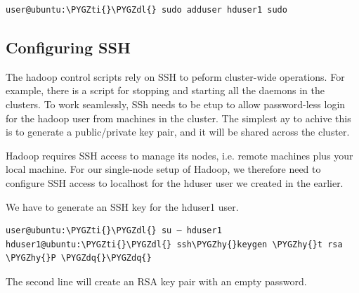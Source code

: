 \documentclass[a4paper,12pt,oneside]{sphinxmanual}
\def\PYGZdl{\char`\$}
\def\PYGZhy{\char`\-}
\def\PYGZdq{\char`\"}
\def\PYGZti{\char`\~}
\begin{document}
\begin{Verbatim}[commandchars=\\\{\}]
user@ubuntu:\PYGZti{}\PYGZdl{} sudo adduser hduser1 sudo
\end{Verbatim}


\subsection{Configuring SSH}
\label{document:configuring-ssh}
The hadoop control scripts rely on SSH to peform cluster-wide operations. For example, there is a script for stopping and starting all the daemons in the clusters. To work seamlessly, SSh needs to be etup to allow password-less login for the hadoop user from machines in the cluster. The simplest ay to achive this is to generate a public/private key pair, and it will be shared across the cluster.

Hadoop requires SSH access to manage its nodes, i.e. remote machines plus your local machine. For our single-node setup of Hadoop, we therefore need to configure SSH access to localhost for the hduser user we created in the earlier.

We have to generate an SSH key for the hduser1 user.

\begin{Verbatim}[commandchars=\\\{\}]
user@ubuntu:\PYGZti{}\PYGZdl{} su – hduser1
hduser1@ubuntu:\PYGZti{}\PYGZdl{} ssh\PYGZhy{}keygen \PYGZhy{}t rsa \PYGZhy{}P \PYGZdq{}\PYGZdq{}
\end{Verbatim}
\begin{figure}[htbp]
\centering

\end{figure}

The second line will create an RSA key pair with an empty password.
\end{document}
